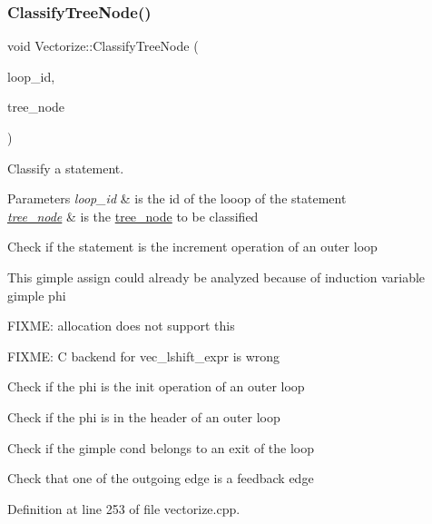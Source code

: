 \subsubsection{\texorpdfstring{Classify\+Tree\+Node()}{ClassifyTreeNode()}}
{\footnotesize\ttfamily void Vectorize\+::\+Classify\+Tree\+Node (\begin{DoxyParamCaption}\item[{const unsigned int}]{loop\+\_\+id,  }\item[{const \hyperlink{tree__node_8hpp_a3cf5d02292c940f3892425a5b5fdec3c}{tree\+\_\+node\+Const\+Ref}}]{tree\+\_\+node }\end{DoxyParamCaption})\hspace{0.3cm}{\ttfamily [private]}}



Classify a statement. 


\begin{DoxyParams}{Parameters}
{\em loop\+\_\+id} & is the id of the looop of the statement \\
\hline
{\em \hyperlink{classtree__node}{tree\+\_\+node}} & is the \hyperlink{classtree__node}{tree\+\_\+node} to be classified \\
\hline
\end{DoxyParams}
Check if the statement is the increment operation of an outer loop

This gimple assign could already be analyzed because of induction variable gimple phi

F\+I\+X\+ME\+: allocation does not support this

F\+I\+X\+ME\+: C backend for vec\+\_\+lshift\+\_\+expr is wrong

Check if the phi is the init operation of an outer loop

Check if the phi is in the header of an outer loop

Check if the gimple cond belongs to an exit of the loop

Check that one of the outgoing edge is a feedback edge 

Definition at line 253 of file vectorize.\+cpp.



